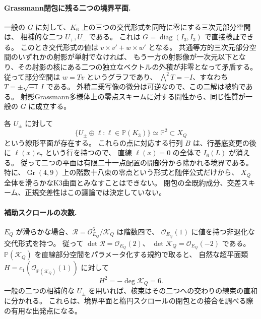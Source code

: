 \paragraph{Grassmann閉包に残る二つの境界平面.}
一般の $G$ に対して、$K_6$ 上の三つの交代形式を同時に零にする三次元部分空間は、
相補的な二つ $U_+,U_-$ である。
これは $G=\operatorname{diag}(I_3,I_3)$ で直接検証できる。
このとき交代形式の値は $v\times v'+w\times w'$ となる。
共通等方的三次元部分空間のいずれかの射影が単射でなければ、
もう一方の射影像が一次元以下となり、その射影の核にある二つの独立なベクトルの外積が非零となって矛盾する。
従って部分空間は $w=Tv$ というグラフであり、
$\bigwedge^2T=-I$、すなわち $T=\pm\sqrt{-1}\,I$ である。
外積二乗写像の微分は可逆なので、この二解は被約である。
射影Grassmann多様体上の零点スキームに対する開性から、同じ性質が一般の $G$ に成立する。

各 $U_\pm$ に対して
\[
 \{U_\pm\oplus\ell:\ell\in\mathbb P(K_3)\}\simeq\mathbb P^2
 \subset X_Q
\]
という線形平面が存在する。
これらの点に対応する行列 $B$ は、行基底変更の後に $\ell(x)e_7$ という行を持つので、
直線 $\ell(x)=0$ の全体で $I_6(L)$ が消える。
従って二つの平面は有限二十一点配置の開部分から除かれる境界である。
特に、$\operatorname{Gr}(4,9)$ 上の階数十八束の零点という形式と随伴公式だけから、
$X_Q$ 全体を滑らかなK3曲面とみなすことはできない。
閉包の全既約成分、交差スキーム、正規交差性はこの議論では決定していない。

\paragraph{補助スクロールの次数.}
$E_Q$ が滑らかな場合、$\mathcal R=\mathcal O_{E_Q}^6/\mathcal K_Q$ は階数四で、
$\mathcal O_{E_Q}(1)$ に値を持つ非退化な交代形式を持つ。
従って $\det\mathcal R=\mathcal O_{E_Q}(2)$、
$\det\mathcal K_Q=\mathcal O_{E_Q}(-2)$ である。
$\mathbb P(\mathcal K_Q)$ を直線部分空間をパラメータ化する規約で取ると、
自然な超平面類 $H=c_1(\mathcal O_{\mathbb P(\mathcal K_Q)}(1))$ に対して
\[
 H^2=-\deg\mathcal K_Q=6.
\]
一般の二つの相補的な $U_\pm$ を用いれば、核束はその二つへの交わりの線束の直和に分かれる。
これらは、境界平面と楕円スクロールの閉包との接合を調べる際の有用な出発点になる。
